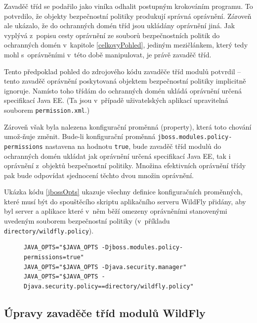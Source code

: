 Zavaděč tříd se podařilo jako viníka odhalit postupným krokováním programu.
To potvrdilo, že objekty bezpečnostní politiky produkují správná oprávnění.
Zároveň ale ukázalo, že do ochranných domén tříd jsou ukládány oprávnění jiná.
Jak vyplývá z~popisu cesty oprávnění ze souborů bezpečnostních politik do ochranných domén v~kapitole \ref{celkovyPohled},
jediným mezičlánkem, který tedy mohl s~oprávněními v~této době manipulovat, je právě zavaděč tříd.

Tento předpoklad pohled do zdrojového kódu zavaděče tříd modulů potvrdil -- tento zavaděč oprávnění poskytovaná objektem bezpečnostní politiky implicitně ignoruje.
Namísto toho třídám do ochranných domén ukládá oprávnění určená specifikací Java EE. \cite{javaEEspec}
(Ta jsou v~případě uživatelských aplikací upravitelná souborem {\tt permission.xml}.)

Zároveň však byla nalezena konfigurační proměnná (property), která toto chování umož-{\linebreak}ňuje změnit.
Bude-li konfigurační proměnná {\tt jboss.modules.policy-permissions} nastavena na hodnotu {\tt true}, bude zavaděč tříd modulů do ochranných domén ukládat jak oprávnění určená specifikací Java EE, tak i oprávnění z~objektů bezpečnostní politiky.
Množina efektivních oprávnění třídy pak bude odpovídat sjednocení těchto dvou množin oprávnění.
\cite{sourceModuleClassLoader}

Ukázka kódu \ref{jbossOpts} ukazuje všechny definice konfiguračních proměnných, které musí být do spouštěcího skriptu aplikačního serveru WildFly přidány,
aby byl server a aplikace které v~něm běží omezeny oprávněními stanovenými uvedeným souborem bezpečnostní politiky (v~příkladu {\tt directory/wildfly.policy}).

\begin{figure}[tbh]
\begin{lstlisting}[caption=Úprava spouštěcího skriptu pro spuštění s~bezpečnostní politikou, label=jbossOpts]
JAVA_OPTS="$JAVA_OPTS -Djboss.modules.policy-permissions=true"
JAVA_OPTS="$JAVA_OPTS -Djava.security.manager"
JAVA_OPTS="$JAVA_OPTS -Djava.security.policy==directory/wildfly.policy"
\end{lstlisting}
\end{figure}

\subsection{Úpravy zavaděče tříd modulů WildFly} \label{upravaZavadeceWildFly}

